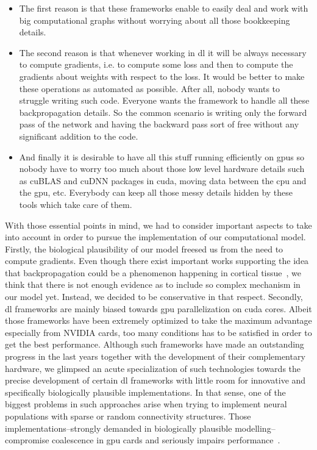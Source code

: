 \documentclass[10pt,journal,compsoc]{IEEEtran}
\begin{document}
\begin{itemize}
	\item The first reason is that these frameworks enable to easily deal and work with big computational graphs without worrying about all those bookkeeping details.
	\item The second reason is that whenever working in \gls{dl} it will be always necessary to compute gradients, i.e. to compute some loss and then to compute the gradients about weights with respect to the loss. It would be better to make these operations as automated as possible. After all, nobody wants to struggle writing such code. Everyone wants the framework to handle all these backpropagation details. So the common scenario is writing only the forward pass of the network and having the backward pass sort of free without any significant addition to the code.
	\item And finally it is desirable to have all this stuff running efficiently on \glspl{gpu} so nobody have to worry too much about those low level hardware details such as cuBLAS and cuDNN packages in \gls{cuda}, moving data between the \gls{cpu} and the \gls{gpu}, etc. Everybody can keep all those messy details hidden by these tools which take care of them.
\end{itemize}

With those essential points in mind, we had to consider important aspects to take into account in order to pursue the implementation of our computational model. Firstly, the biological plausibility of our model freesed us from the need to compute gradients. Even though there exist important works supporting the idea that backpropagation could be a phenomenon happening in cortical tissue~\cite{Guerguiev2017TowardsDL}, we think that there is not enough evidence as to include so complex mechanism in our model yet. Instead, we decided to be conservative in that respect. Secondly, \gls{dl} frameworks are mainly biased towards \gls{gpu} parallelization on \gls{cuda} cores. Albeit those frameworks have been extremely optimized to take the maximum advantage especially from NVIDIA cards, too many conditions has to be satisfied in order to get the best performance. Although such frameworks have made an outstanding progress in the last years together with the development of their complementary hardware, we glimpsed an acute specialization of such technologies towards the precise development of certain \gls{dl} frameworks with little room for innovative and specifically biologically plausible implementations. In that sense, one of the biggest problems in such approaches arise when trying to implement neural populations with sparse or random connectivity structures. Those implementations--strongly demanded in biologically plausible modelling--compromise coalescence in \gls{gpu} cards and seriously impairs performance~\cite{doi:10.3109/0954898X.2012.739292}.
\end{document}
